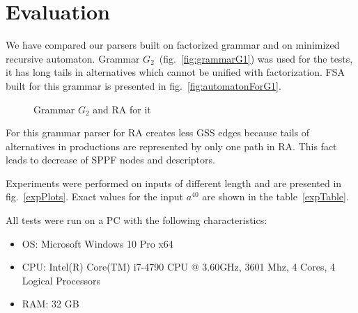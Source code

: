 \documentclass[runningheads,a4paper]{llncs}
\begin{document}





\section{Evaluation}

We have compared our parsers built on factorized grammar and on minimized recursive automaton.
Grammar $G_2$~(fig.~\ref{fig:grammarG1}) was used for the tests, it has long tails in alternatives which cannot be unified with factorization.
FSA built for this grammar is presented in fig.~\ref{fig:automatonForG1}.

\begin{figure}[ht]   
    \centering

    \caption{Grammar $G_2$ and RA for it}
\end{figure}

For this grammar parser for RA creates less GSS edges because tails of alternatives in productions
are represented by only one path in RA. This fact leads to decrease of SPPF nodes and descriptors.

Experiments were performed on inputs of different length and are presented in fig.~\ref{expPlots}.
Exact values for the input $a^{40}$ are shown in the table~\ref{expTable}.

All tests were run on a PC with the following characteristics:
\begin{itemize}
    \item OS: Microsoft Windows 10 Pro x64
    \item CPU: Intel(R) Core(TM) i7-4790 CPU @ 3.60GHz, 3601 Mhz, 4 Cores, 4 Logical Processors
    \item RAM: 32 GB
\end{itemize}
\end{document}

